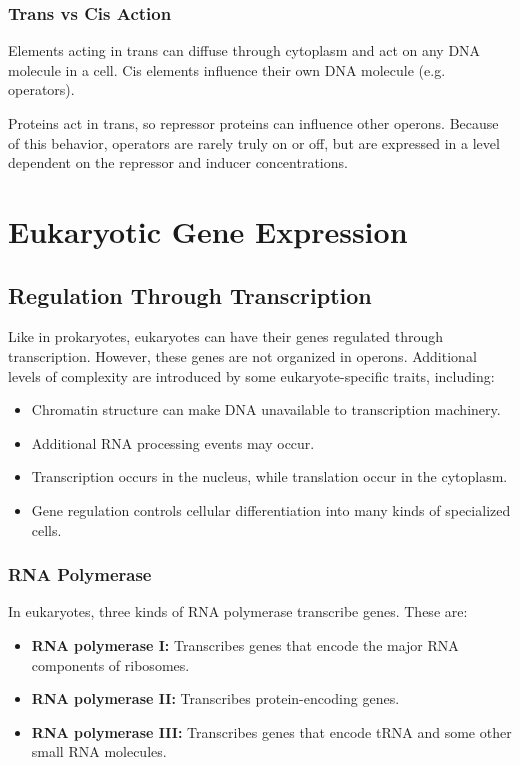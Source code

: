 \documentclass[12pt,titlepage]{article}
\begin{document}
      \subsubsection{Trans vs Cis Action}
        Elements acting in trans can diffuse through cytoplasm and act on any DNA molecule in a cell. Cis elements influence their own DNA molecule (e.g. operators).

        Proteins act in trans, so repressor proteins can influence other operons. Because of this behavior, operators are rarely truly on or off, but are expressed
        in a level dependent on the repressor and inducer concentrations.

  \newpage

  \section{Eukaryotic Gene Expression}

    \subsection{Regulation Through Transcription}
      Like in prokaryotes, eukaryotes can have their genes regulated through transcription. However, these genes are not organized in operons. Additional levels
      of complexity are introduced by some eukaryote-specific traits, including:
      \begin{itemize}
        \item Chromatin structure can make DNA unavailable to transcription machinery.
        \item Additional RNA processing events may occur.
        \item Transcription occurs in the nucleus, while translation occur in the cytoplasm.
        \item Gene regulation controls cellular differentiation into many kinds of specialized cells.
      \end{itemize}

      \subsubsection{RNA Polymerase}
        In eukaryotes, three kinds of RNA polymerase transcribe genes. These are:
        \begin{itemize}
          \item \textbf{RNA polymerase I:} Transcribes genes that encode the major RNA components of ribosomes.
          \item \textbf{RNA polymerase II:} Transcribes protein-encoding genes.
          \item \textbf{RNA polymerase III:} Transcribes genes that encode tRNA and some other small RNA molecules.
        \end{itemize}
\end{document}
